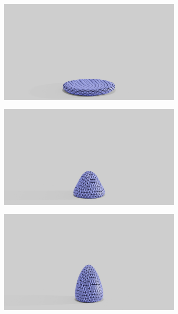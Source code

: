 \begin{figure}[htp!]
\begin{subfigure}{.16\linewidth}
		\label{sfig:ball-045-3}
	\end{subfigure}%
	\begin{subfigure}{.16\linewidth}
		\centering
		{\includegraphics[width=2.0\textwidth]{images/coarse_ball/045/0350.jpg}}
		\label{sfig:ball-045-4}
	\end{subfigure}%
	\begin{subfigure}{.16\linewidth}
		\centering
		{\includegraphics[width=2.0\textwidth]{images/coarse_ball/045/0400.jpg}}
		\label{sfig:ball-045-5}
	\end{subfigure}%
	\begin{subfigure}{.16\linewidth}
		\centering
		{\includegraphics[width=2.0\textwidth]{images/coarse_ball/045/0450.jpg}}

\end{subfigure}
\end{figure}
